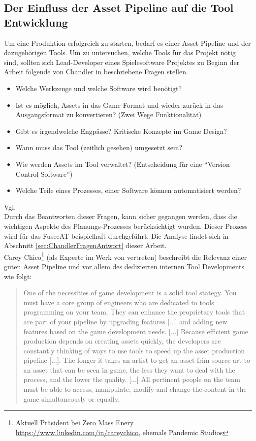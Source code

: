\documentclass[pagesize, paper=a4, fontsize=12pt, titlepage=true, headings=small, headnosepline, abstractoff, liststotoc, nochapterprefix, plainheadsepline, twoside]{scrreprt}
\begin{document}
\subsection {Der Einfluss der Asset Pipeline auf die Tool Entwicklung}\label{sec:ChandlerFragenKatalog}
Um eine Produktion erfolgreich zu starten, bedarf es einer Asset Pipeline und der dazugehörigen Tools. Um zu untersuchen, welche Tools für das Projekt nötig sind, sollten sich Lead-Developer eines Spielesoftware Projektes zu Beginn der Arbeit folgende von Chandler in \parencite[S 223-224]{Chandler2006} beschriebene Fragen stellen.
\begin{itemize}
\item Welche Werkzeuge und welche Software wird benötigt?
\item Ist es möglich, Assets in das Game Format und wieder zurück in das Ausgangsformat zu konvertieren? (Zwei Wege Funktionalität)
\item Gibt es irgendwelche Engpässe? Kritische Konzepte im Game Design?
\item Wann muss das Tool (zeitlich gesehen) umgesetzt sein?
\item Wie werden Assets im Tool verwaltet? (Entscheidung für eine “Version Control Software”)
\item Welche Teile eines Prozesses, einer Software können automatisiert werden?
\end{itemize} Vgl. \autocite[S. 224-225]{Chandler2006}
\\
Durch das Beantworten dieser Fragen, kann sicher gegangen werden, dass die wichtigen Aspekte des Planungs-Prozesses berücksichtigt wurden. Dieser Prozess wird für das FuseeAT beispielhaft durchgeführt. Die Analyse findet sich in Abschnitt \ref{sec:ChandlerFragenAntwort} dieser Arbeit.
\\
Carey Chico\footnote{Aktuell Präsident bei Zero Mass Enery \url{https://www.linkedin.com/in/careychico}, ehemals Pandemic Studios} (als Experte im Werk von \cite{Chandler2006} vertreten) beschreibt die Relevanz einer guten Asset Pipeline und vor allem des dedizierten internen Tool Developments wie folgt:
\begin{quote}
\glqq One of the necessities of game development is a solid tool stategy. You must have a core group of engineers who are dedicated to tools programming on your team. They can enhance the proprietary tools that are part of your pipeline by upgrading features [...] and adding new features based on the game development needs. [...] Because efficient game production depends on creating assets quickly, the developers are constantly thinking of ways to use tools to speed up the asset production pipeline [...]. The longer it takes an artist to get an asset frim source art to an asset that can be seen in game, the less they want to deal with the process, and the lower the quality.
[...]
All pertinent people on the team must be able to access, manipulate, modify and change the content in the game simultaneously or equally.\grqq{}
\autocite[S. 224-225]{Chandler2006}
\end{quote}
\end{document}
